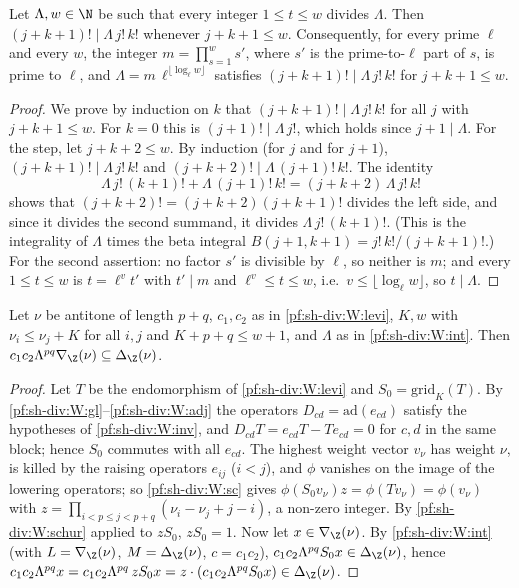 \begin{lemma}\label{pf:sh-div:betaden}
Let $\Lambda,w\in\N$ be such that every integer $1\le t\le w$ divides $\Lambda$. Then $(j+k+1)!\mid\Lambda\,j!\,k!$ whenever $j+k+1\le w$.
Consequently, for every prime $\ell$ and every $w$, the integer $m=\prod_{s=1}^{w}s'$, where $s'$ is the prime-to-$\ell$ part of $s$, is prime
to $\ell$, and $\Lambda=m\,\ell^{\lfloor\log_\ell w\rfloor}$ satisfies $(j+k+1)!\mid\Lambda\,j!\,k!$ for $j+k+1\le w$.
\end{lemma}

\begin{proof}
We prove by induction on $k$ that $(j+k+1)!\mid\Lambda\,j!\,k!$ for all $j$ with $j+k+1\le w$. For $k=0$ this is $(j+1)!\mid\Lambda\,j!$, which
holds since $j+1\mid\Lambda$. For the step, let $j+k+2\le w$. By induction (for $j$ and for $j+1$),
$(j+k+1)!\mid\Lambda\,j!\,k!$ and $(j+k+2)!\mid\Lambda\,(j+1)!\,k!$. The identity
\[
\Lambda\,j!\,(k+1)!+\Lambda\,(j+1)!\,k!=(j+k+2)\,\Lambda\,j!\,k!
\]
shows that $(j+k+2)!=(j+k+2)(j+k+1)!$ divides the left side, and since it divides the second summand, it divides
$\Lambda\,j!\,(k+1)!$. (This is the integrality of $\Lambda$ times the beta integral $B(j+1,k+1)=j!\,k!/(j+k+1)!$.)
For the second assertion: no factor $s'$ is divisible by $\ell$, so neither is $m$; and every $1\le t\le w$ is $t=\ell^{v}t'$ with $t'\mid m$ and
$\ell^v\le t\le w$, i.e.\ $v\le\lfloor\log_\ell w\rfloor$, so $t\mid\Lambda$.
\end{proof}

\begin{lemma}\label{pf:sh-div:cutincl}
Let $\nu$ be antitone of length $p+q$, $c_1,c_2$ as in \ref{pf:sh-div:W:levi}, $K,w$ with $\nu_i\le\nu_j+K$ for all $i,j$ and $K+p+q\le w+1$,
and $\Lambda$ as in \ref{pf:sh-div:W:int}. Then $c_1c_2\Lambda^{pq}\nabla_\Z(\nu)\subseteq\Delta_\Z(\nu)$.
\end{lemma}

\begin{proof}
Let $T$ be the endomorphism of \ref{pf:sh-div:W:levi} and $S_0=\mathrm{grid}_K(T)$. By \ref{pf:sh-div:W:gl}--\ref{pf:sh-div:W:adj} the operators
$D_{cd}=\mathrm{ad}(e_{cd})$ satisfy the hypotheses of \ref{pf:sh-div:W:inv}, and $D_{cd}T=e_{cd}T-Te_{cd}=0$ for $c,d$ in the same block;
hence $S_0$ commutes with all $e_{cd}$. The highest weight vector $v_\nu$ has weight $\nu$, is killed by the raising operators $e_{ij}$
($i<j$), and $\phi$ vanishes on the image of the lowering operators; so \ref{pf:sh-div:W:sc} gives $\phi(S_0v_\nu)z=\phi(Tv_\nu)=\phi(v_\nu)$ with
$z=\prod_{i<p\le j<p+q}(\nu_i-\nu_j+j-i)$, a non-zero integer. By \ref{pf:sh-div:W:schur} applied to $zS_0$, $zS_0=1$. Now let
$x\in\nabla_\Z(\nu)$. By \ref{pf:sh-div:W:int} (with $L=\nabla_\Z(\nu)$, $M=\Delta_\Z(\nu)$, $c=c_1c_2$), $c_1c_2\Lambda^{pq}S_0x\in\Delta_\Z(\nu)$, hence
$c_1c_2\Lambda^{pq}x=c_1c_2\Lambda^{pq}\,zS_0x=z\cdot(c_1c_2\Lambda^{pq}S_0x)\in\Delta_\Z(\nu)$.
\end{proof}

